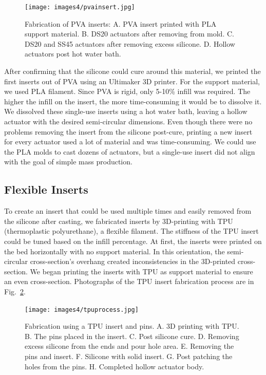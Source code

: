 \begin{figure}[!ht]
    \centering
    \texttt{[image: images4/pvainsert.jpg]}
    \caption{Fabrication of PVA inserts: A. PVA insert printed with PLA support material. B. DS20 actuators after removing from mold. C. DS20 and SS45 actuators after removing excess silicone. D. Hollow actuators post hot water bath.}
    \label{fig:pvainsert}
\end{figure}

After confirming that the silicone could cure around this material, we printed the first inserts out of PVA using an Ultimaker 3D printer. For the support material, we used PLA filament. Since PVA is rigid, only 5-10\% infill was required. The higher the infill on the insert, the more time-consuming it would be to dissolve it. We dissolved these single-use inserts using a hot water bath, leaving a hollow actuator with the desired semi-circular dimensions. Even though there were no problems removing the insert from the silicone post-cure, printing a new insert for every actuator used a lot of material and was time-consuming. We could use the PLA molds to cast dozens of actuators, but a single-use insert did not align with the goal of simple mass production.

\subsection{Flexible Inserts}

To create an insert that could be used multiple times and easily removed from the silicone after casting, we fabricated inserts by 3D-printing with TPU (thermoplastic polyurethane), a flexible filament. The stiffness of the TPU insert could be tuned based on the infill percentage. At first, the inserts were printed on the bed horizontally with no support material. In this orientation, the semi-circular cross-section's overhang created inconsistencies in the 3D-printed cross-section. We began printing the inserts with TPU as support material to ensure an even cross-section. Photographs of the TPU insert fabrication process are in Fig.~\ref{fig:tpuprocess}. \\

\begin{figure}[!ht]
    \centering
    \texttt{[image: images4/tpuprocess.jpg]}
    \caption{Fabrication using a TPU insert and pins. A. 3D printing with TPU. B. The pins placed in the insert.  C. Post silicone cure. D. Removing excess silicone from the ends and pour hole area. E. Removing the pins and insert. F. Silicone with solid insert. G. Post patching the holes from the pins. H. Completed hollow actuator body.}
    \label{fig:tpuprocess}
\end{figure}

